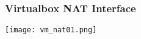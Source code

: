 \begin{frame}
\frametitle{Virtualbox NAT Interface}
    \center\texttt{[image: vm\_nat01.png]}
\end{frame}
